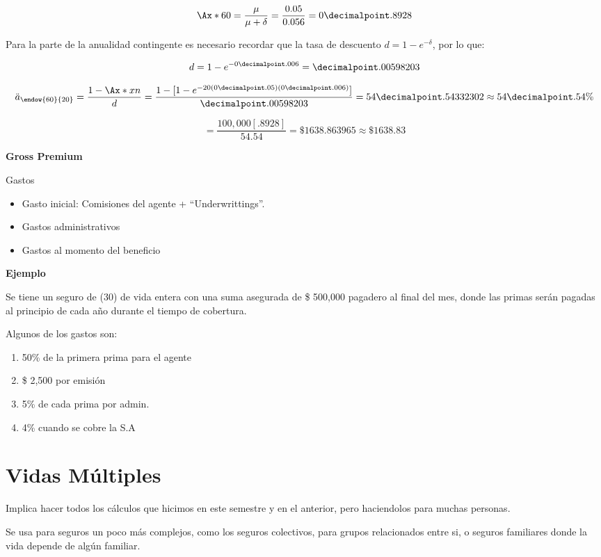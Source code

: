\documentclass[12pt, a4paper, footinclude=true]{scrbook}
\begin{document}
\[
	\Ax*{60} = \frac{\mu}{\mu + \delta} = \frac{0.05}{0.056} = 0 \decimalpoint. 8928
\]

Para la parte de la anualidad contingente es necesario recordar que la tasa de descuento $d = 1 - e^{-\delta}$, por lo que: 

\[
	d =  1 - e ^ {-0\decimalpoint.006} = \decimalpoint.00598203
\]	

\[
	\ddot{a}_{\endow{60}{20}} = \frac{1 - \Ax*{x}{n}}{d} = \frac{1 - [1 - e^{-20(0\decimalpoint.05)(0\decimalpoint.006)}]}{\decimalpoint.00598203} = 54\decimalpoint.54332302 \approx 54\decimalpoint.54 \%
\]

\[
	= \frac{100,000[.8928]}{54.54} = \$ 1638.863965 \approx \boxed{\$ 1638.83}
\]

\textbf{Gross Premium}

Gastos

\begin{itemize}
	\item Gasto inicial: Comisiones del agente + ``Underwrittings''.
	\item Gastos administrativos
	\item Gastos al momento del beneficio
\end{itemize}

\textbf{Ejemplo}

Se tiene un seguro de (30) de vida entera con una suma asegurada de \$ 500,000 pagadero al final del mes, donde las primas serán pagadas al principio de cada año durante el tiempo de cobertura. 

Algunos de los gastos son: 

\begin{enumerate}
	\item 50\% de la primera prima para el agente  \item \$ 2,500 por emisión 
	\item 5\% de cada prima por admin. 
	\item 4\% cuando se cobre la S.A
\end{enumerate}

\section{Vidas Múltiples}

Implica hacer todos los cálculos que hicimos en este semestre y en el anterior, pero haciendolos para muchas personas. 

Se usa para seguros un poco más complejos, como los seguros colectivos, para grupos relacionados entre si, o seguros familiares donde la vida depende de algún familiar. 
\end{document}
